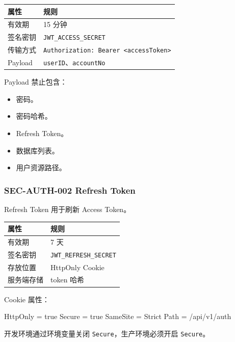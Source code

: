 \documentclass[
  a4paper,
  UTF8]{ctexart}
\newenvironment{Shaded}{}{}
\newcommand{\NormalTok}[1]{#1}
\providecommand{\tightlist}{%
  \setlength{\itemsep}{0pt}\setlength{\parskip}{0pt}}
\begin{document}
\begin{longtable}[]{@{}ll@{}}
\toprule
属性 & 规则 \\
\midrule
\endhead
有效期 & 15 分钟 \\
签名密钥 & \texttt{JWT\_ACCESS\_SECRET} \\
传输方式 &
\texttt{Authorization:\ Bearer\ \textless{}accessToken\textgreater{}} \\
Payload & \texttt{userID}、\texttt{accountNo} \\
\bottomrule
\end{longtable}

Payload 禁止包含：

\begin{itemize}
\tightlist
\item
  密码。
\item
  密码哈希。
\item
  Refresh Token。
\item
  数据库列表。
\item
  用户资源路径。
\end{itemize}

\hypertarget{sec-auth-002-refresh-token}{%
\subsubsection{SEC-AUTH-002 Refresh
Token}\label{sec-auth-002-refresh-token}}

Refresh Token 用于刷新 Access Token。

\begin{longtable}[]{@{}ll@{}}
\toprule
属性 & 规则 \\
\midrule
\endhead
有效期 & 7 天 \\
签名密钥 & \texttt{JWT\_REFRESH\_SECRET} \\
存放位置 & HttpOnly Cookie \\
服务端存储 & token 哈希 \\
\bottomrule
\end{longtable}

Cookie 属性：

\begin{Shaded}
\begin{Highlighting}[]
\NormalTok{HttpOnly = true}
\NormalTok{Secure = true}
\NormalTok{SameSite = Strict}
\NormalTok{Path = /api/v1/auth}
\end{Highlighting}
\end{Shaded}

开发环境通过环境变量关闭 \texttt{Secure}，生产环境必须开启
\texttt{Secure}。
\end{document}

